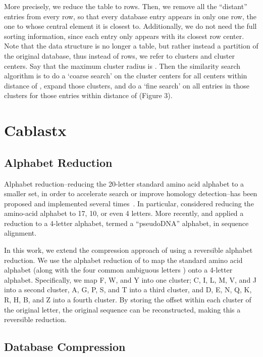 \documentclass{amsbook}
\theoremstyle{definition}
\theoremstyle{remark}
\numberwithin{equation}{section}
\begin{document}
More precisely, we reduce the table to  rows.
Then, we remove all the “distant” entries from every row, so that every database entry appears in only one row, the one to whose central element it is closest to.
Additionally, we do not need the full sorting information, since each entry only appears with its closest row center.
Note that the data structure is no longer a table, but rather instead a partition of the original database, thus instead of rows, we refer to clusters and cluster centers.
Say that the maximum cluster radius is .
Then the similarity search algorithm is to do a ‘coarse search’ on the cluster centers for all centers within distance  of , expand those clusters, and do a ‘fine search’ on all entries in those clusters for those entries within distance  of  (Figure 3).

\section{Cablastx}

\subsection*{Alphabet Reduction}

Alphabet reduction--reducing the 20-letter standard amino acid alphabet to a
smaller set, in order to accelerate search or improve homology detection--has
been proposed and implemented several times~\cite{blah}.
In particular, \citet{Murphy:2000, Peterson:2009} considered reducing the
amino-acid alphabet to 17, 10, or even 4 letters.
More recently, \citet{Zhao:2012} and \citet{Huson:2013} applied a reduction to
a 4-letter alphabet, termed a ``pseudoDNA'' alphabet, in sequence alignment.

In this work, we extend the compression approach of \citet{Daniels:2013} using
a reversible alphabet reduction.
We use the alphabet reduction of \citet{Murphy:2000} to map the standard amino
acid alphabet (along with the four common ambiguous letters ) onto a 4-letter 
alphabet.
Specifically, we map F, W, and Y into one cluster; C, I, L, M, V, and J into
a second cluster, A, G, P, S, and T into a third cluster, and
D, E, N, Q, K, R, H, B, and Z into a fourth cluster.
By storing the offset within each cluster of the original letter, the original
sequence can be reconstructed, making this a reversible reduction.

\subsection*{Database Compression}
\end{document}

